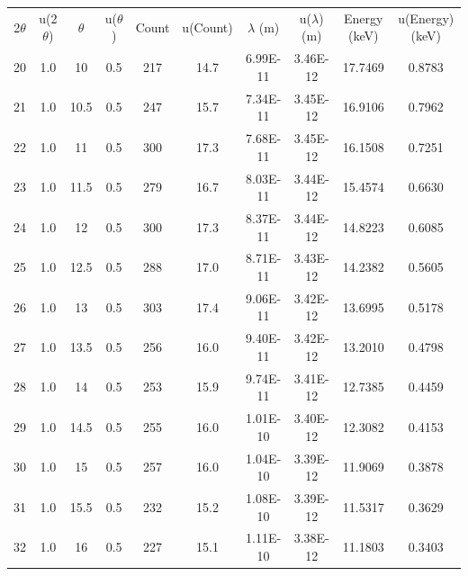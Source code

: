 \begin{maintable}[ht]
\center
\begin{tabular}{cccccccccc}
\multicolumn{1}{c}{2$\theta$} & \multicolumn{1}{c}{u(2$\theta$)} & \multicolumn{1}{c}{$\theta$} & \multicolumn{1}{c}{u($\theta$)} & \multicolumn{1}{c}{Count} & \multicolumn{1}{c}{u(Count)} & \multicolumn{1}{c}{$\lambda$ (m)} & \multicolumn{1}{c}{u($\lambda$) (m)} & \multicolumn{1}{c}{Energy (keV)} & \multicolumn{1}{c}{u(Energy) (keV)} \\
20          & 1.0   & 10         & 0.5           & 217     & 14.7       & 6.99E-11    & 3.46E-12       & 17.7469   & 0.8783       \\
21          & 1.0   & 10.5       & 0.5           & 247     & 15.7       & 7.34E-11    & 3.45E-12       & 16.9106   & 0.7962       \\
22          & 1.0   & 11         & 0.5           & 300     & 17.3       & 7.68E-11    & 3.45E-12       & 16.1508   & 0.7251       \\
23          & 1.0   & 11.5       & 0.5           & 279     & 16.7       & 8.03E-11    & 3.44E-12       & 15.4574   & 0.6630       \\
24          & 1.0   & 12         & 0.5           & 300     & 17.3       & 8.37E-11    & 3.44E-12       & 14.8223   & 0.6085       \\
25          & 1.0   & 12.5       & 0.5           & 288     & 17.0       & 8.71E-11    & 3.43E-12       & 14.2382   & 0.5605       \\
26          & 1.0   & 13         & 0.5           & 303     & 17.4       & 9.06E-11    & 3.42E-12       & 13.6995   & 0.5178       \\
27          & 1.0   & 13.5       & 0.5           & 256     & 16.0       & 9.40E-11    & 3.42E-12       & 13.2010   & 0.4798       \\
28          & 1.0   & 14         & 0.5           & 253     & 15.9       & 9.74E-11    & 3.41E-12       & 12.7385   & 0.4459       \\
29          & 1.0   & 14.5       & 0.5           & 255     & 16.0       & 1.01E-10    & 3.40E-12       & 12.3082   & 0.4153       \\
30          & 1.0   & 15         & 0.5           & 257     & 16.0       & 1.04E-10    & 3.39E-12       & 11.9069   & 0.3878       \\
31          & 1.0   & 15.5       & 0.5           & 232     & 15.2       & 1.08E-10    & 3.39E-12       & 11.5317   & 0.3629       \\
32          & 1.0   & 16         & 0.5           & 227     & 15.1       & 1.11E-10    & 3.38E-12       & 11.1803   & 0.3403       \\

\end{tabular}
\end{maintable}
